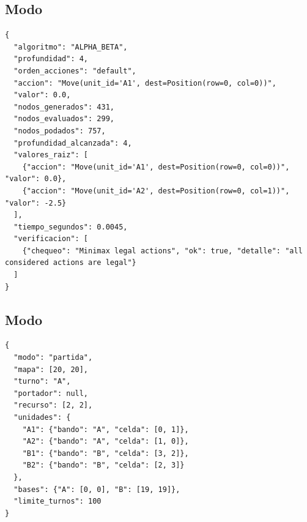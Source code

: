 \subsection{Modo }
\begin{verbatim}
{
  "algoritmo": "ALPHA_BETA",
  "profundidad": 4,
  "orden_acciones": "default",
  "accion": "Move(unit_id='A1', dest=Position(row=0, col=0))",
  "valor": 0.0,
  "nodos_generados": 431,
  "nodos_evaluados": 299,
  "nodos_podados": 757,
  "profundidad_alcanzada": 4,
  "valores_raiz": [
    {"accion": "Move(unit_id='A1', dest=Position(row=0, col=0))", "valor": 0.0},
    {"accion": "Move(unit_id='A2', dest=Position(row=0, col=1))", "valor": -2.5}
  ],
  "tiempo_segundos": 0.0045,
  "verificacion": [
    {"chequeo": "Minimax legal actions", "ok": true, "detalle": "all considered actions are legal"}
  ]
}
\end{verbatim}

\subsection{Modo }
\begin{verbatim}
{
  "modo": "partida",
  "mapa": [20, 20],
  "turno": "A",
  "portador": null,
  "recurso": [2, 2],
  "unidades": {
    "A1": {"bando": "A", "celda": [0, 1]},
    "A2": {"bando": "A", "celda": [1, 0]},
    "B1": {"bando": "B", "celda": [3, 2]},
    "B2": {"bando": "B", "celda": [2, 3]}
  },
  "bases": {"A": [0, 0], "B": [19, 19]},
  "limite_turnos": 100
}
\end{verbatim}